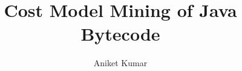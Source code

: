 \documentclass[defaultstyle,11pt]{thesis}
\title{Cost Model Mining of Java Bytecode}
\author{Aniket Kumar}{Lata}
\begin{document}
\begin{flushleft}










%
%

\end{flushleft}
\end{document}
